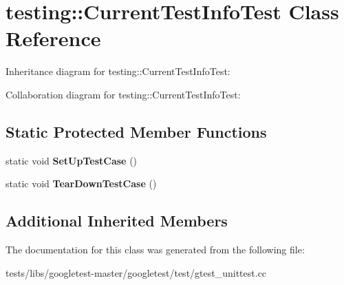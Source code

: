 \hypertarget{classtesting_1_1CurrentTestInfoTest}{}\section{testing\+:\+:Current\+Test\+Info\+Test Class Reference}
\label{classtesting_1_1CurrentTestInfoTest}


Inheritance diagram for testing\+:\+:Current\+Test\+Info\+Test\+:


Collaboration diagram for testing\+:\+:Current\+Test\+Info\+Test\+:
\subsection*{Static Protected Member Functions}
\begin{DoxyCompactItemize}
\item 
\mbox{\label{classtesting_1_1CurrentTestInfoTest_a61bad7ce29923afd464daf9684b6269e}} 
static void {\bfseries Set\+Up\+Test\+Case} ()
\item 
\mbox{\label{classtesting_1_1CurrentTestInfoTest_a9a80a5a3e6e70c619870c2ae9df892a6}} 
static void {\bfseries Tear\+Down\+Test\+Case} ()
\end{DoxyCompactItemize}
\subsection*{Additional Inherited Members}


The documentation for this class was generated from the following file\+:\begin{DoxyCompactItemize}
\item 
tests/libs/googletest-\/master/googletest/test/gtest\+\_\+unittest.\+cc\end{DoxyCompactItemize}
